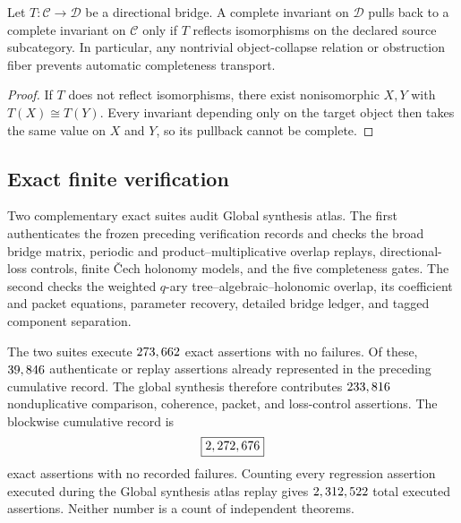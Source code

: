 \begin{proposition}
\label{prop:block13-no-directional-completeness}
Let \(T:\mathcal C\to\mathcal D\) be a directional bridge.  A complete invariant on \(\mathcal D\) pulls back to a complete invariant on \(\mathcal C\) only if \(T\) reflects isomorphisms on the declared source subcategory.  In particular, any nontrivial object-collapse relation or obstruction fiber prevents automatic completeness transport.
\end{proposition}

\begin{proof}
If \(T\) does not reflect isomorphisms, there exist nonisomorphic \(X,Y\) with \(T(X)\cong T(Y)\).  Every invariant depending only on the target object then takes the same value on \(X\) and \(Y\), so its pullback cannot be complete.
\end{proof}

\subsection{Exact finite verification}
\label{subsec:block13-verification}

Two complementary exact suites audit Global synthesis atlas.  The first authenticates the frozen preceding verification records and checks the broad bridge matrix, periodic and product--multiplicative overlap replays, directional-loss controls, finite \v{C}ech holonomy models, and the five completeness gates.  The second checks the weighted \(q\)-ary tree--algebraic--holonomic overlap, its coefficient and packet equations, parameter recovery, detailed bridge ledger, and tagged component separation.





The two suites execute \(273,662\) exact assertions with no failures.  Of these, \(39,846\) authenticate or replay assertions already represented in the preceding cumulative record.  The global synthesis therefore contributes \(233,816\) nonduplicative comparison, coherence, packet, and loss-control assertions.  The blockwise cumulative record is
\[
 \boxed{2,272,676}
\]
exact assertions with no recorded failures.  Counting every regression assertion executed during the Global synthesis atlas replay gives \(2,312,522\) total executed assertions.  Neither number is a count of independent theorems.

